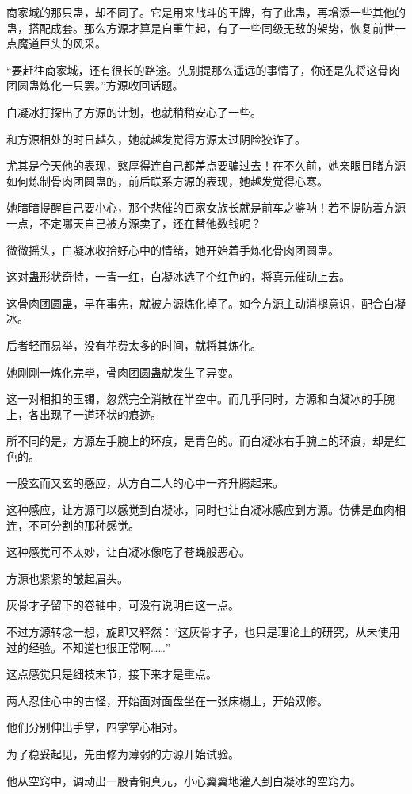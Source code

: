 \begin{this_body}
商家城的那只蛊，却不同了。它是用来战斗的王牌，有了此蛊，再增添一些其他的蛊，搭配成套。那么方源才算是自重生起，有了一些同级无敌的架势，恢复前世一点魔道巨头的风采。

“要赶往商家城，还有很长的路途。先别提那么遥远的事情了，你还是先将这骨肉团圆蛊炼化一只罢。”方源收回话题。

白凝冰打探出了方源的计划，也就稍稍安心了一些。

和方源相处的时日越久，她就越发觉得方源太过阴险狡诈了。

尤其是今天他的表现，憨厚得连自己都差点要骗过去！在不久前，她亲眼目睹方源如何炼制骨肉团圆蛊的，前后联系方源的表现，她越发觉得心寒。

她暗暗提醒自己要小心，那个悲催的百家女族长就是前车之鉴呐！若不提防着方源一点，不定哪天自己被方源卖了，还在替他数钱呢？

微微摇头，白凝冰收拾好心中的情绪，她开始着手炼化骨肉团圆蛊。

这对蛊形状奇特，一青一红，白凝冰选了个红色的，将真元催动上去。

这骨肉团圆蛊，早在事先，就被方源炼化掉了。如今方源主动消褪意识，配合白凝冰。

后者轻而易举，没有花费太多的时间，就将其炼化。

她刚刚一炼化完毕，骨肉团圆蛊就发生了异变。

这一对相扣的玉镯，忽然完全消散在半空中。而几乎同时，方源和白凝冰的手腕上，各出现了一道环状的痕迹。

所不同的是，方源左手腕上的环痕，是青色的。而白凝冰右手腕上的环痕，却是红色的。

一股玄而又玄的感应，从方白二人的心中一齐升腾起来。

这种感应，让方源可以感觉到白凝冰，同时也让白凝冰感应到方源。仿佛是血肉相连，不可分割的那种感觉。

这种感觉可不太妙，让白凝冰像吃了苍蝇般恶心。

方源也紧紧的皱起眉头。

灰骨才子留下的卷轴中，可没有说明白这一点。

不过方源转念一想，旋即又释然：“这灰骨才子，也只是理论上的研究，从未使用过的经验。不知道也很正常啊……”

这点感觉只是细枝末节，接下来才是重点。

两人忍住心中的古怪，开始面对面盘坐在一张床榻上，开始双修。

他们分别伸出手掌，四掌掌心相对。

为了稳妥起见，先由修为薄弱的方源开始试验。

他从空窍中，调动出一股青铜真元，小心翼翼地灌入到白凝冰的空窍力。


\end{this_body}
